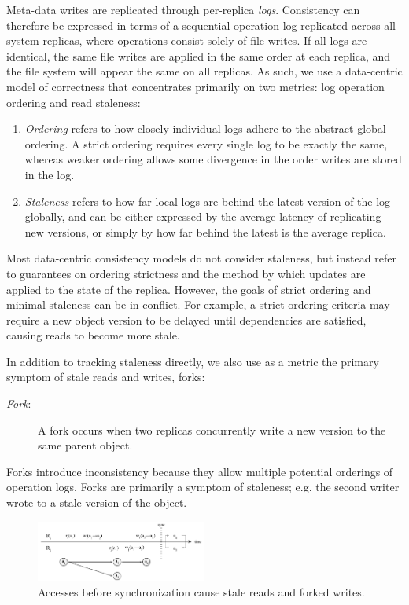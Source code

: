\documentclass[10pt,conference,letterpaper]{IEEEtran}
\begin{document}
Meta-data writes are replicated through per-replica \emph{logs}.
Consistency can therefore be expressed in terms of a sequential operation log replicated across all
system replicas, where operations consist solely of file writes.
If all logs are identical, the same file writes are applied in the same
order at each replica, and the file system will appear the same on all replicas.
As such, we use a {data-centric} model of
correctness that concentrates primarily on two metrics: log operation ordering and
read staleness:
\begin{enumerate}
\item \emph{Ordering} refers to how closely individual logs adhere to the abstract
  global ordering. A strict ordering requires every single log to be exactly the
  same, whereas weaker ordering allows some divergence in the order writes are stored in
  the log.
\item \emph{Staleness} refers to how far local logs are behind the latest version of the log globally,
  and can be either expressed by the average latency of replicating new versions, or
  simply by how far behind the latest is the average replica.
\end{enumerate}

Most data-centric consistency models do not consider staleness, but instead refer to
guarantees on ordering strictness and the method by which updates are applied to the state
of the replica.
However, the goals of strict ordering and minimal staleness can be in conflict. For
example, a strict ordering criteria may require a new object version to be delayed until
dependencies are satisfied, causing reads to become more stale.

In addition to tracking staleness directly, we also use as a metric the primary symptom of stale
reads and writes, forks:
\begin{description}
    \item[\textit{Fork}:] A fork occurs when two replicas concurrently write a new version to the same parent object. 
\end{description}
Forks introduce inconsistency because they allow multiple potential orderings of operation
logs. 
Forks are primarily a symptom of staleness; e.g. the second writer wrote to
a stale version of the object.

\begin{figure}[t]
    \centering
    \includegraphics[width=0.5\textwidth]{figures/forks}
    \caption{Accesses before synchronization cause stale reads and forked writes.}
    \label{fig:forks}
\end{figure}
\end{document}
